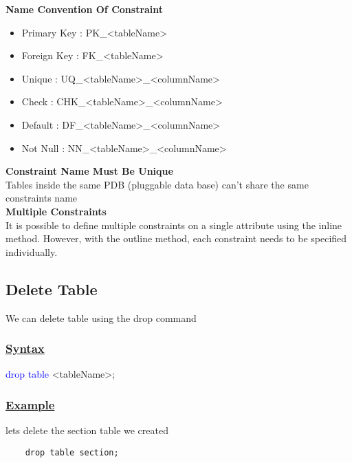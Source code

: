 \begin{tcolorbox}[title = Note]
    \textbf{Name Convention Of Constraint}
    \begin{itemize}
        \item Primary Key : PK\_\textless tableName\textgreater  
        \item Foreign Key : FK\_\textless tableName\textgreater
        \item Unique : UQ\_\textless tableName\textgreater\_\textless columnName\textgreater
        \item Check : CHK\_\textless tableName\textgreater\_\textless columnName\textgreater
        \item Default : DF\_\textless tableName\textgreater\_\textless columnName\textgreater
        \item Not Null : NN\_\textless tableName\textgreater\_\textless columnName\textgreater
    \end{itemize}
    \textbf{Constraint Name Must Be Unique}\\
    Tables inside the same PDB (pluggable data base) can't share the same constraints name\\
    \textbf{Multiple Constraints}\\
 It is possible to define multiple constraints on a single attribute using the inline method. 
However, with the outline method, each constraint needs to be specified individually.
\end{tcolorbox}
\subsection{Delete Table}
\begin{tcolorbox}[title = Definition]
    We can delete table using the drop command
\end{tcolorbox}
\subsubsection{\underline{Syntax}}
\begin{tcolorbox}[title = Table Deletion]
    \textcolor{blue}{drop table}  \textless tableName\textgreater;
\end{tcolorbox}
\subsubsection{\underline{Example}}
lets delete the section table we created 
\begin{lstlisting}
    drop table section;
\end{lstlisting}
